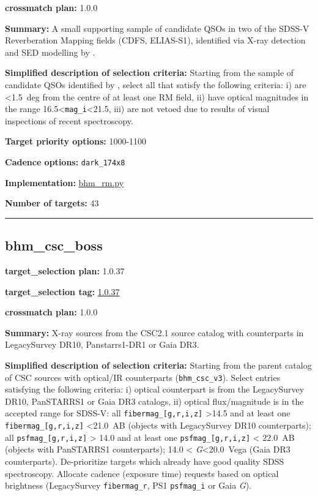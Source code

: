 \noindent\textbf{crossmatch plan:} 1.0.0

\noindent\textbf{Summary:} A small supporting sample of candidate QSOs in two of
the SDSS-V Reverberation Mapping fields (CDFS, ELIAS-S1), identified via
X-ray detection and SED modelling by
\citealt{Ni2021}.

\noindent\textbf{Simplified description of selection criteria:} Starting from the
sample of candidate QSOs identified by
\citealt{Ni2021}, select all that satisfy the following criteria: i) are
\textless1.5~deg from the centre of at least one RM field, ii) have
optical magnitudes in the range
16.5\textless{}\texttt{mag\_i}\textless21.5, iii) are not vetoed due to
results of visual inspections of recent spectroscopy.


\noindent\textbf{Target priority options:} 1000-1100

\noindent\textbf{Cadence options:} \texttt{dark\_174x8}

\noindent\textbf{Implementation:}
\href{https://github.com/sdss/target_selection/blob/1.0.12/python/target_selection/cartons/bhm_rm.py}{bhm\_rm.py}

\noindent\textbf{Number of targets:} 43

\begin{center}\rule{0.5\linewidth}{0.5pt}\end{center}

\hypertarget{bhm_csc_boss_plan1.0.37}{%
\subsection{bhm\_csc\_boss}\label{bhm_csc_boss_plan1.0.37}}

\noindent\textbf{target\_selection plan:} 1.0.37

\noindent\textbf{target\_selection tag:}
\href{https://github.com/sdss/target_selection/tree/1.0.37/}{1.0.37}

\noindent\textbf{crossmatch plan:} 1.0.0

\noindent\textbf{Summary:} X-ray sources from the CSC2.1 source catalog with
counterparts in LegacySurvey DR10, Panstarrs1-DR1 or Gaia DR3.

\noindent\textbf{Simplified description of selection criteria:} Starting from the
parent catalog of CSC sources with optical/IR counterparts
(\texttt{bhm\_csc\_v3}). Select entries satisfying the following
criteria: i) optical counterpart is from the LegacySurvey DR10,
PanSTARRS1 or Gaia DR3 catalogs, ii) optical flux/magnitude is in the
accepted range for SDSS-V: all \texttt{fibermag\_{[}g,r,i,z{]}}
\textgreater14.5 and at least one \texttt{fibermag\_{[}g,r,i,z{]}}
\textless21.0~AB (objects with LegacySurvey DR10 counterparts); all
\texttt{psfmag\_{[}g,r,i,z{]}} \textgreater{} 14.0 and at least one
\texttt{psfmag\_{[}g,r,i,z{]}} \textless{} 22.0~AB (objects with
PanSTARRS1 counterparts); 14.0 \textless{} \emph{G}\textless20.0~Vega
(Gaia DR3 counterparts). De-prioritize targets which already have good
quality SDSS spectroscopy. Allocate cadence (exposure time) requests
based on optical brightness (LegacySurvey \texttt{fibermag\_r}, PS1
\texttt{psfmag\_i} or Gaia \emph{G}).


